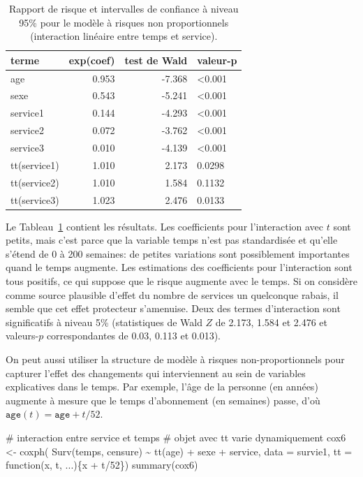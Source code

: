 \documentclass[
  11pt,
  letterpaper,
]{scrbook}
\newenvironment{Shaded}{\begin{snugshade}}{\end{snugshade}}
\newcommand{\AttributeTok}[1]{\textcolor[rgb]{0.40,0.45,0.13}{#1}}
\newcommand{\CommentTok}[1]{\textcolor[rgb]{0.37,0.37,0.37}{#1}}
\newcommand{\ControlFlowTok}[1]{\textcolor[rgb]{0.00,0.23,0.31}{#1}}
\newcommand{\DecValTok}[1]{\textcolor[rgb]{0.68,0.00,0.00}{#1}}
\newcommand{\FunctionTok}[1]{\textcolor[rgb]{0.28,0.35,0.67}{#1}}
\newcommand{\NormalTok}[1]{\textcolor[rgb]{0.00,0.23,0.31}{#1}}
\newcommand{\OtherTok}[1]{\textcolor[rgb]{0.00,0.23,0.31}{#1}}
\newcommand{\SpecialCharTok}[1]{\textcolor[rgb]{0.37,0.37,0.37}{#1}}
\theoremstyle{definition}
\theoremstyle{remark}
\begin{document}
\hypertarget{tbl-coxnph}{}
\begin{table}
\caption{\label{tbl-coxnph}Rapport de risque et intervalles de confiance à niveau 95\% pour le
modèle à risques non proportionnels (interaction linéaire entre temps et
service). }\tabularnewline

\centering
\begin{tabular}{lrrl}
\toprule
terme & exp(coef) & test de Wald & valeur-p\\
\midrule
age & 0.953 & -7.368 & <0.001\\
sexe & 0.543 & -5.241 & <0.001\\
service1 & 0.144 & -4.293 & <0.001\\
service2 & 0.072 & -3.762 & <0.001\\
service3 & 0.010 & -4.139 & <0.001\\
\addlinespace
tt(service1) & 1.010 & 2.173 & 0.0298\\
tt(service2) & 1.010 & 1.584 & 0.1132\\
tt(service3) & 1.023 & 2.476 & 0.0133\\
\bottomrule
\end{tabular}
\end{table}

Le Tableau~\ref{tbl-coxnph} contient les résultats. Les coefficients
pour l'interaction avec \(t\) sont petits, mais c'est parce que la
variable temps n'est pas standardisée et qu'elle s'étend de 0 à 200
semaines: de petites variations sont possiblement importantes quand le
temps augmente. Les estimations des coefficients pour l'interaction sont
tous positifs, ce qui suppose que le risque augmente avec le temps. Si
on considère comme source plausible d'effet du nombre de services un
quelconque rabais, il semble que cet effet protecteur s'amenuise. Deux
des termes d'interaction sont significatifs à niveau 5\% (statistiques
de Wald \(Z\) de 2.173, 1.584 et 2.476 et valeurs-\(p\) correspondantes
de 0.03, 0.113 et 0.013).

On peut aussi utiliser la structure de modèle à risques
non-proportionnels pour capturer l'effet des changements qui
interviennent au sein de variables explicatives dans le temps. Par
exemple, l'âge de la personne (en années) augmente à mesure que le temps
d'abonnement (en semaines) passe, d'où
\(\texttt{age}(t) = \texttt{age} + t/52\).

\begin{Shaded}
\begin{Highlighting}[]
\CommentTok{\# interaction entre service et temps}
\CommentTok{\# objet avec \textquotesingle{}tt\textquotesingle{} varie dynamiquement}
\NormalTok{cox6 }\OtherTok{\textless{}{-}} \FunctionTok{coxph}\NormalTok{(}
    \FunctionTok{Surv}\NormalTok{(temps, censure) }\SpecialCharTok{\textasciitilde{}} 
     \FunctionTok{tt}\NormalTok{(age) }\SpecialCharTok{+}\NormalTok{ sexe }\SpecialCharTok{+}\NormalTok{ service, }
     \AttributeTok{data =}\NormalTok{ survie1, }
     \AttributeTok{tt =} \ControlFlowTok{function}\NormalTok{(x, t, ...)\{x }\SpecialCharTok{+}\NormalTok{ t}\SpecialCharTok{/}\DecValTok{52}\NormalTok{\})}
\FunctionTok{summary}\NormalTok{(cox6)}
\end{Highlighting}
\end{Shaded}
\end{document}
